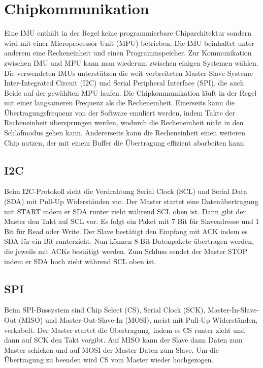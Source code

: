 \section{Chipkommunikation}
Eine IMU enthält in der Regel keine programmierbare Chiparchitektur sondern wird mit einer Microprocessor Unit (MPU) betrieben.
Die IMU beinhaltet unter anderem eine Recheneinheit und einen Programmspeicher.
Zur Kommunikation zwischen IMU und MPU kann man wiederum zwischen einigen Systemen wählen.
Die verwendeten IMUs unterstützen die weit verbreiteten Master-Slave-Systeme Inter-Integrated Circuit (I2C) und Serial Peripheral Interface (SPI), die auch Beide auf der gewählten MPU laufen.
Die Chipkommunikation läuft in der Regel mit einer langsameren Frequenz als die Recheneinheit.
Einerseits kann die Übertragungsfrequenz von der Software emuliert werden, indem Takte der Recheneinheit übersprungen werden, wodurch die Recheneinheit nicht in den Schlafmodus gehen kann.
Andererseits kann die Recheneinheit einen weiteren Chip nutzen, der mit einem Buffer die Übertragung effizient abarbeiten kann.

\subsection{I2C}
Beim I2C-Protokoll sieht die Verdrahtung Serial Clock (SCL) und Serial Data (SDA) mit Pull-Up Widerständen vor.
Der Master startet eine Datenübertragung mit START indem er SDA runter zieht während SCL oben ist.
Dann gibt der Master den Takt auf SCL vor.
Es folgt ein Paket mit 7 Bit für Slaveadresse und 1 Bit für Read oder Write.
Der Slave bestätigt den Empfang mit ACK indem es SDA für ein Bit runterzieht.
Nun können 8-Bit-Datenpakete übertragen werden, die jeweils mit ACKs bestätigt werden.
Zum Schluss sendet der Master STOP indem er SDA hoch zieht während SCL oben ist. \cite{manual_i2c}

\subsection{SPI}
Beim SPI-Bussystem sind Chip Select (CS), Serial Clock (SCK), Master-In-Slave-Out (MISO) und Master-Out-Slave-In (MOSI), meist mit Pull-Up Widerständen, verkabelt.
Der Master startet die Übertragung, indem es CS runter zieht und dann auf SCK den Takt vorgibt.
Auf MISO kann der Slave dann Daten zum Master schicken und auf MOSI der Master Daten zum Slave.
Um die Übertragung zu beenden wird CS vom Master wieder hochgezogen. \cite{site_micSpi}

